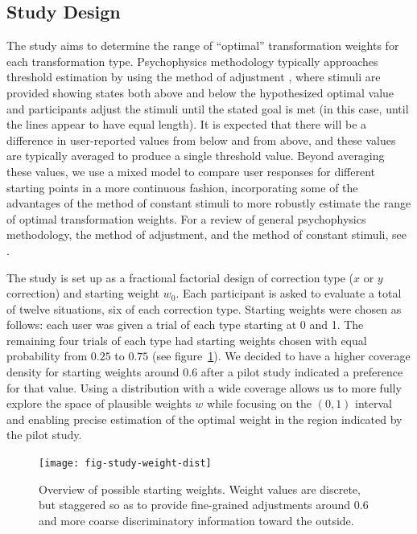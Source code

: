 \documentclass[11pt]{isuthesis}\usepackage[]{graphicx}\usepackage[]{color}
\begin{document}
\subsection{Study Design}
The study aims to determine the range of ``optimal'' transformation weights for each transformation type. Psychophysics methodology typically approaches threshold estimation by using the method of adjustment \citep{goldstein}, where  stimuli are provided showing states both above and below the hypothesized optimal value and  participants adjust the stimuli until the stated goal is met (in this case, until the lines appear to have equal length). It is expected that there will be a difference in user-reported values from below and from above, and these values are typically averaged to produce a single threshold value. Beyond averaging these values, we use a mixed model to compare user responses for different starting points in a more continuous fashion, incorporating some of the advantages of the method of constant stimuli to more robustly estimate the range of optimal transformation weights. For a review of general psychophysics methodology, the method of adjustment, and the method of constant stimuli, see \citet{goldstein}.

The study is set up as a fractional factorial design of correction type ($x$ or $y$ correction) and starting weight $w_0$. Each participant is asked to evaluate a total of twelve situations, six of each correction type.
Starting weights were chosen as follows: each user was given a trial of each type starting at 0 and 1. The remaining four trials of each type had starting weights chosen with equal probability from $0.25$ to $0.75$ 
(see figure~\ref{fig:weightdist}). 
We decided to  have a higher coverage density for starting weights around 0.6 after a pilot study indicated a preference for that value. Using a distribution with a wide coverage allows us to more fully explore the space of plausible weights $w$ while focusing on the $(0,1)$ interval and enabling precise estimation of the optimal weight in the region indicated by the pilot study.

\begin{figure}\centering
\texttt{[image: fig-study-weight-dist]}
\caption[Overview of possible starting weights]{Overview of possible starting weights. Weight values are discrete, but staggered so as to provide fine-grained adjustments around 0.6 and more coarse discriminatory information toward the outside.}\label{fig:weightdist}
\end{figure}
\end{document}
